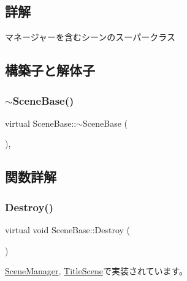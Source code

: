 \subsection{詳解}
マネージャーを含むシーンのスーパークラス 

\subsection{構築子と解体子}
\mbox{\label{class_scene_base_a187dd160e5a16909bcc6529851e38318}} 
\subsubsection{\texorpdfstring{$\sim$\+Scene\+Base()}{~SceneBase()}}
{\footnotesize\ttfamily virtual Scene\+Base\+::$\sim$\+Scene\+Base (\begin{DoxyParamCaption}{ }\end{DoxyParamCaption})\hspace{0.3cm}{\ttfamily [inline]}, {\ttfamily [virtual]}}



\subsection{関数詳解}
\mbox{\label{class_scene_base_a7c5b54020bc519b4dadfe9770d6b27f7}} 
\subsubsection{\texorpdfstring{Destroy()}{Destroy()}}
{\footnotesize\ttfamily virtual void Scene\+Base\+::\+Destroy (\begin{DoxyParamCaption}{ }\end{DoxyParamCaption})\hspace{0.3cm}{\ttfamily [pure virtual]}}



\mbox{\hyperlink{class_scene_manager_a0e3ad11342e763f0d4108c0b4674a157}{Scene\+Manager}}, \mbox{\hyperlink{class_title_scene_adfbc5f934572ede2e36419b089c88fe8}{Title\+Scene}}で実装されています。

\mbox{\label{class_scene_base_a24d7db43c819924dc8b07b436f6d3148}} 
